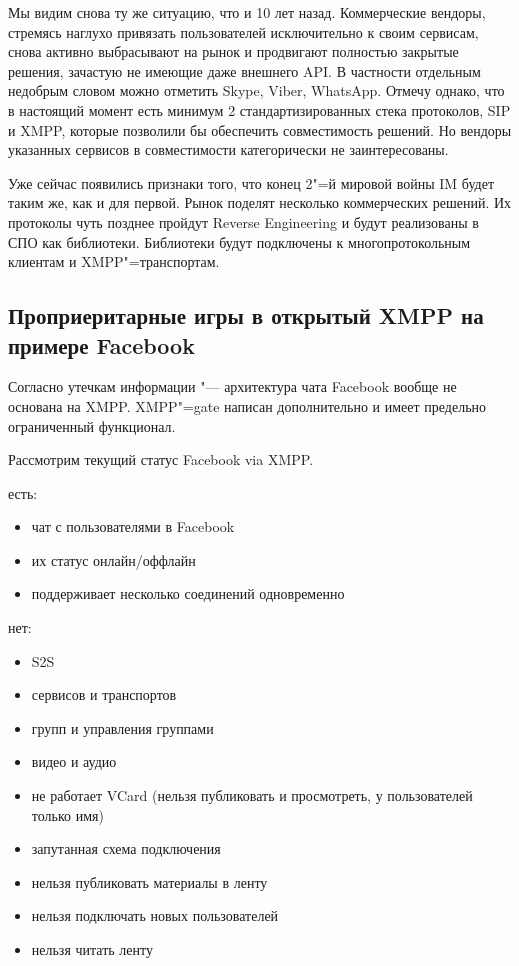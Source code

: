 \documentclass[10pt, a5paper]{article}
\begin{document}
Мы видим снова ту же ситуацию, что и 10 лет назад. Коммерческие вендоры, стремясь наглухо привязать пользователей исключительно к своим сервисам, снова активно выбрасывают на рынок и продвигают полностью закрытые решения, зачастую не имеющие даже внешнего API. В частности отдельным недобрым словом можно отметить Skype, Viber, WhatsApp.  Отмечу однако, что в настоящий момент есть минимум 2 стандартизированных стека протоколов, SIP и XMPP, которые позволили бы обеспечить совместимость решений.  Но вендоры указанных сервисов в совместимости категорически не заинтересованы.

Уже сейчас появились признаки того, что конец 2"=й мировой войны IM будет таким же, как и для первой. Рынок поделят несколько коммерческих решений. Их  протоколы чуть позднее пройдут Reverse Engineering и будут реализованы в СПО как библиотеки. Библиотеки будут подключены  к многопротокольным клиентам и XMPP"=транспортам.

\subsection*{Проприеритарные игры в открытый XMPP на примере Facebook}

Согласно утечкам информации "--- архитектура чата Facebook вообще не основана на XMPP. XMPP"=gate написан дополнительно и имеет предельно ограниченный функционал.

Рассмотрим текущий статус Facebook via XMPP.

есть:

\begin{itemize}
  \item чат с пользователями в Facebook
  \item их статус онлайн/оффлайн
  \item поддерживает несколько соединений одновременно
\end{itemize}

нет:

\begin{itemize}
  \item S2S
  \item сервисов и транспортов
  \item групп и управления группами
  \item видео и аудио
  \item не работает VCard (нельзя публиковать и просмотреть, у пользователей только имя)
  \item запутанная схема подключения
  \item нельзя публиковать материалы в ленту
  \item нельзя подключать новых пользователей
  \item нельзя читать ленту
\end{itemize}
\end{document}
